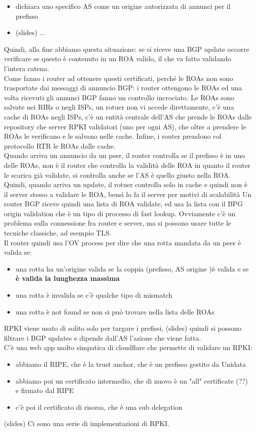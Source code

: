 \documentclass[12pt, oneside]{extbook} %
\begin{document}
\begin{itemize}
	\item dichiara uno specifico AS come un origine autorizzata di annunci per il prefisso
	\item (slides) ...
\end{itemize}
Quindi, alla fine abbiamo questa situazione:
se si riceve una BGP update occorre verificare se questo è contenuto in un ROA valido, il che va fatto validando l'intera catena.\\Come fanno i router ad ottenere questi certificati, perché le ROAs non sono trasportate dai messaggi di annuncio BGP: i router ottengono le ROAs ed una volta ricevuti gli annunci BGP fanno un controllo incrociato. Le ROAs sono salvate nei RIRs o negli ISPs, un rotuer non vi accede direttamente, c'è una cache di ROAs negli ISPs, c'è un entità centrale dell'AS che prende le ROAs dalle repository che server RPKI validatori (uno per ogni AS), che oltre a prendere le ROAs le verificano e le salvano nelle cache. Infine, i router prendono col protocollo RTR le ROAs dalle cache.\\Quando arriva un annuncio da un peer, il router controlla se il prefisso è in uno delle ROAs, non è il router che controlla la validità delle ROA in quanto il router le scarica già validate, si controlla anche se l'AS è quello giusto nella ROA.\\Quindi, quando arriva un update, il rotuer controlla solo in cache e quindi non è il server stesso a validare le ROA, bensì lo fa il server per motivi di scalabilità
Un router BGP riceve quindi una lista di ROA validate, ed usa la lista con il BPG origin validation che è un tipo di processo di fast lookup. Ovviamente c'è un problema sulla connessione fra router e server, ma si possono usare tutte le tecniche classiche, ad esempio TLS.\\Il router quindi usa l'OV process per dire che una rotta mandata da un peer è valida se:
\begin{itemize}
	\item una rotta ha un'origine valida se la coppia (prefisso, AS origine )è valida e se \textbf{è valida la lunghezza massima}
	\item una rotta è invalida se c'è qualche tipo di mismatch
	\item una rotta è not found se non si può trovare nella lista delle ROAs
\end{itemize}
RPKI viene usato di solito solo per targare i prefissi, (slides) quindi si possono filtrare i BGP updates e dipende dall'AS l'azione che viene fatta.\\C'è una web app molto simpatica di cloudflare che permette di validare un RPKI:
\begin{itemize}
	\item abbiamo il RIPE, che è la trust anchor, che è un prefisso gestito da Unidata
	\item abbiamo poi un certificato intermedio, che di nuovo è un "all" certificate (??) e firmato dal RIPE
	\item c'è poi il certificato di risorsa, che è una sub delegation
\end{itemize}
(slides)
Ci sono una serie di implementazioni di RPKI.
\end{document}
